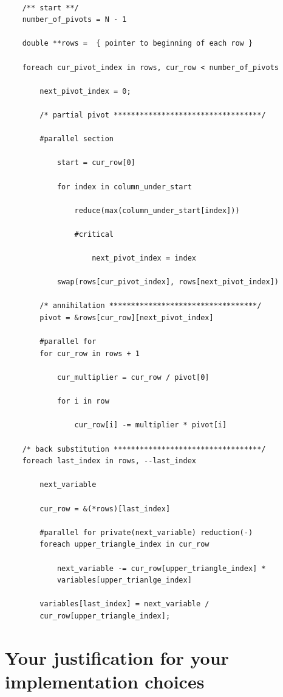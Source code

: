 \documentclass[a4paper,12pt]{article}
\begin{document}
    \begin{verbatim}

    /** start **/
    number_of_pivots = N - 1

    double **rows =  { pointer to beginning of each row }

    foreach cur_pivot_index in rows, cur_row < number_of_pivots

        next_pivot_index = 0;

        /* partial pivot **********************************/

        #parallel section

            start = cur_row[0]

            for index in column_under_start

                reduce(max(column_under_start[index]))

                #critical

                    next_pivot_index = index

            swap(rows[cur_pivot_index], rows[next_pivot_index])

        /* annihilation **********************************/
        pivot = &rows[cur_row][next_pivot_index]

        #parallel for
        for cur_row in rows + 1

            cur_multiplier = cur_row / pivot[0]

            for i in row

                cur_row[i] -= multiplier * pivot[i]

    /* back substitution **********************************/
    foreach last_index in rows, --last_index

        next_variable

        cur_row = &(*rows)[last_index]

        #parallel for private(next_variable) reduction(-)
        foreach upper_triangle_index in cur_row

            next_variable -= cur_row[upper_triangle_index] *
            variables[upper_trianlge_index]

        variables[last_index] = next_variable /
        cur_row[upper_triangle_index];

    \end{verbatim}


\section{Your justification for your implementation choices}
\end{document}
